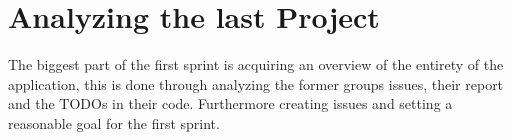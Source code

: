 \section{Analyzing the last Project}

The biggest part of the first sprint is acquiring an overview of the entirety of the application, this is done through analyzing the former groups issues, their report and the TODOs in their code. Furthermore creating issues and setting a reasonable goal for the first sprint.


